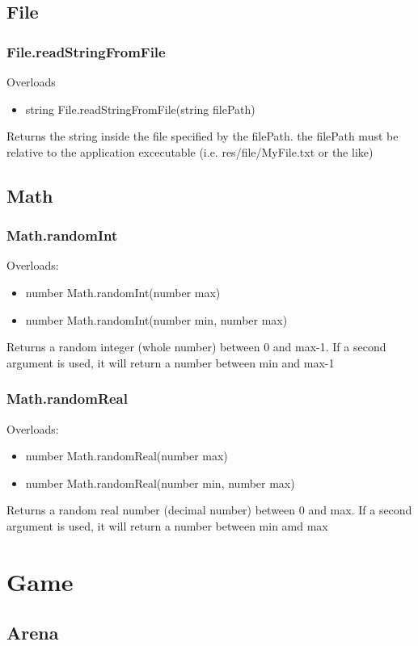 \documentclass{book}
\newenvironment{ulist}
	{\begin{itemize}
			\itemsep0em}
	{\end{itemize}}
\begin{document}
\subsection{File}
\subsubsection{File.readStringFromFile}
Overloads
\begin{ulist}
	\item string File.readStringFromFile(string filePath)
\end{ulist}
Returns the string inside the file specified by the filePath. the filePath must be relative to the application excecutable (i.e. res/file/MyFile.txt or the like)


\subsection{Math}
\subsubsection{Math.randomInt}
Overloads:
\begin{ulist}
	\item number Math.randomInt(number max)
	\item number Math.randomInt(number min, number max)
\end{ulist}
Returns a random integer (whole number) between 0 and max-1.
If a second argument is used, it will return a number between min and max-1

\subsubsection{Math.randomReal}
Overloads:
\begin{ulist}
	\item number Math.randomReal(number max)
	\item number Math.randomReal(number min, number max)
\end{ulist}
Returns a random real number (decimal number) between 0 and max.
If a second argument is used, it will return a number between min amd max



\section{Game}
\subsection{Arena}
\end{document}
